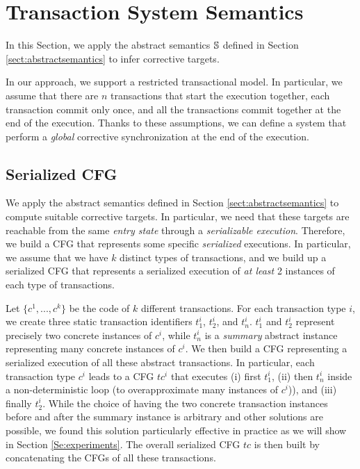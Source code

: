 \section{Transaction System Semantics}
\label{sec:transactionsystemwarping}
In this Section, we apply the abstract semantics $\mathbb{S}$ defined in Section \ref{sect:abstractsemantics} to infer corrective targets.

In our approach, we support a restricted transactional model. In particular, we assume that there are $n$ transactions that start the execution together, each transaction commit only once, and all the transactions commit together at the end of the execution. Thanks to these assumptions, we can define a system that perform a \emph{global} corrective synchronization at the end of the execution.


\subsection{Serialized CFG}
\label{Se:concabs}
We apply the abstract semantics defined in Section \ref{sect:abstractsemantics} to compute suitable corrective targets. In particular, we need that these targets are reachable from the same \emph{entry state} through a \emph{serializable execution}. Therefore, we build a CFG that represents some specific \emph{serialized} executions. In particular, we assume that we have $k$ distinct types of transactions, and we build up a serialized CFG that represents a serialized execution of \emph{at least} 2 instances of each type of transactions.

Let $\{c^1, ..., c^k\}$ be the code of $k$ different transactions. For each transaction type $i$, we create three static transaction identifiers $t^i_1$, $t^i_2$, and $t^i_n$. $t^i_1$ and $t^i_2$ represent precisely two concrete instances of $c^i$, while $t^i_n$ is a \emph{summary} abstract instance representing many concrete instances of $c^i$. We then build a CFG representing a serialized execution of all these abstract transactions. In particular, each transaction type $c^i$ leads to a CFG $tc^i$ that executes (i) first $t^i_1$, (ii) then $t^i_n$ inside a non-deterministic loop (to overapproximate many instances of $c^i$)), and (iii) finally $t^i_2$. While the choice of having the two concrete transaction instances before and after the summary instance is arbitrary and other solutions are possible, we found this solution particularly effective in practice as we will show in Section \ref{Se:experiments}. The overall serialized CFG $tc$ is then built by concatenating the CFGs of all these transactions.

